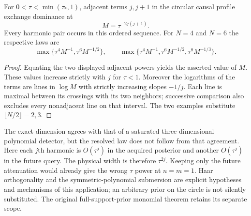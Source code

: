 \begin{corollary}\label{cor:circle-phases}
For $0<\tau<\min(\tau_*,1)$, adjacent terms $j,j+1$ in the circular
causal profile exchange dominance at
\[
 M=\tau^{-2j(j+1)}.
\]
Every harmonic pair occurs in this ordered sequence. For $N=4$ and $N=6$
the respective laws are
\[
 \max\{\tau^4M^{-1},\tau^6M^{-1/2}\},\qquad
 \max\{\tau^4M^{-1},\tau^6M^{-1/2},\tau^8M^{-1/3}\}.
\]
\end{corollary}
\begin{proof}
Equating the two displayed adjacent powers yields the asserted value of
$M$. These values increase strictly with $j$ for $\tau<1$. Moreover
the logarithms of the terms are lines in $\log M$ with strictly
increasing slopes $-1/j$. Each line is maximal between its crossings
with its two neighbors; successive comparison also excludes every
nonadjacent line on that interval. The two examples substitute
$\lfloor N/2\rfloor=2,3$.
\end{proof}

The exact dimension agrees with that of a saturated three-dimensional
polynomial detector, but the resolved law does not follow from that
agreement. Here each $j$th harmonic is $O(\tau^j)$ in the acquired
posterior and another $O(\tau^j)$ in the future query. The physical
width is therefore $\tau^{2j}$. Keeping only the future attenuation
would already give the wrong $\tau$ power at $n=m=1$. Haar orthogonality
and the symmetric-polynomial submersion are explicit hypotheses and
mechanisms of this application; an arbitrary prior on the circle is not
silently substituted. The original full-support-prior monomial theorem
retains its separate scope.
